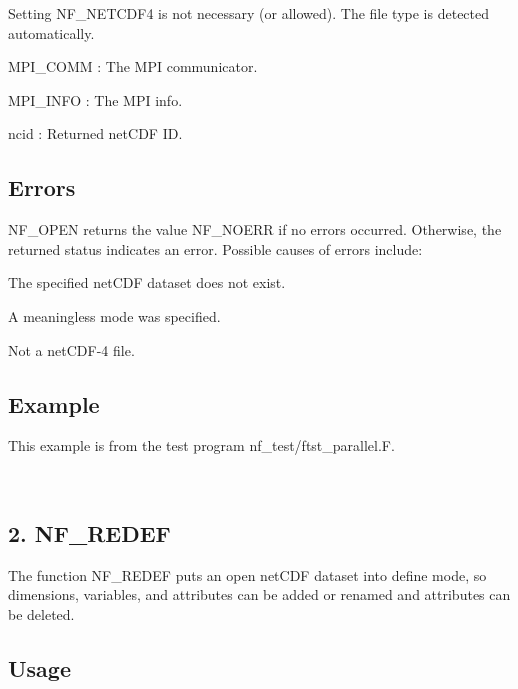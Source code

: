 Setting N\+F\+\_\+\+N\+E\+T\+C\+D\+F4 is not necessary (or allowed). The file type is detected automatically.

{\ttfamily M\+P\+I\+\_\+\+C\+O\+MM} \+: The M\+PI communicator.

{\ttfamily M\+P\+I\+\_\+\+I\+N\+FO} \+: The M\+PI info.

{\ttfamily ncid} \+: Returned net\+C\+DF ID.

\subsection*{Errors }

N\+F\+\_\+\+O\+P\+EN returns the value N\+F\+\_\+\+N\+O\+E\+RR if no errors occurred. Otherwise, the returned status indicates an error. Possible causes of errors include\+:


\begin{DoxyItemize}
\item The specified net\+C\+DF dataset does not exist.
\item A meaningless mode was specified.
\item Not a net\+C\+D\+F-\/4 file.
\end{DoxyItemize}

\subsection*{Example }

This example is from the test program nf\+\_\+test/ftst\+\_\+parallel.\+F.

 


\hypertarget{nc_f77_interface_guide_f77_NF-REDEF}{}\subsection{2. N\+F\+\_\+\+R\+E\+D\+E\+F }\label{nc_f77_interface_guide_f77_NF-REDEF}
The function N\+F\+\_\+\+R\+E\+D\+EF puts an open net\+C\+DF dataset into define mode, so dimensions, variables, and attributes can be added or renamed and attributes can be deleted.

\subsection*{Usage }

